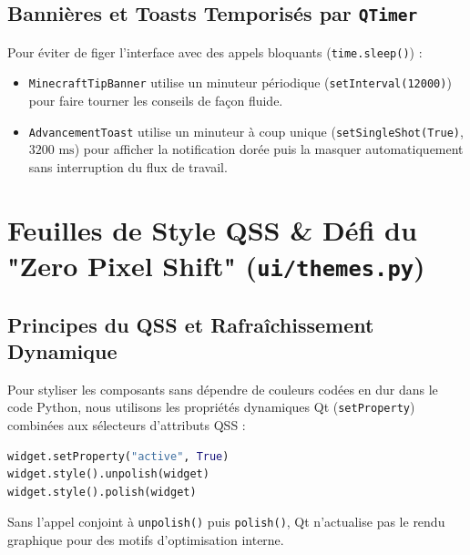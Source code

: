 \documentclass[11pt,a4paper]{report}
\begin{document}
\section{Banni\`eres et Toasts Temporis\'es par \texttt{QTimer}}
Pour \'eviter de figer l'interface avec des appels bloquants (\texttt{time.sleep()}) :
\begin{itemize}
    \item \texttt{MinecraftTipBanner} utilise un minuteur p\'eriodique (\texttt{setInterval(12000)}) pour faire tourner les conseils de fa\c{c}on fluide.
    \item \texttt{AdvancementToast} utilise un minuteur \`a coup unique (\texttt{setSingleShot(True)}, $3200\text{ ms}$) pour afficher la notification dor\'ee puis la masquer automatiquement sans interruption du flux de travail.
\end{itemize}

\chapter{Feuilles de Style QSS \& D\'efi du "Zero Pixel Shift" (\texttt{ui/themes.py})}

\section{Principes du QSS et Rafra\^ichissement Dynamique}
Pour styliser les composants sans d\'ependre de couleurs cod\'ees en dur dans le code Python, nous utilisons les propri\'et\'es dynamiques Qt (\texttt{setProperty}) combin\'ees aux s\'electeurs d'attributs QSS :
\begin{lstlisting}[language=Python]
widget.setProperty("active", True)
widget.style().unpolish(widget)
widget.style().polish(widget)
\end{lstlisting}
Sans l'appel conjoint \`a \texttt{unpolish()} puis \texttt{polish()}, Qt n'actualise pas le rendu graphique pour des motifs d'optimisation interne.
\end{document}
